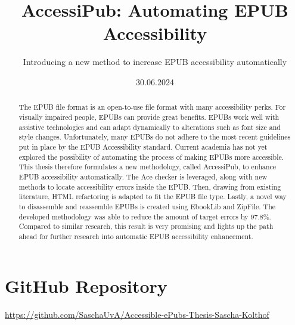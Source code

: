 \documentclass[ds, nofrontpicture, nolinenumbering, nosecondcompanypicture, nofirstcompanypicture]{mscthesis}
\title{AccessiPub: Automating EPUB Accessibility}
\subtitle{Introducing a new method to increase EPUB accessibility automatically}
\date{30.06.2024}
\begin{document}
\pagestyle{plain}

\maketitlepage
\fixemptypage
\setcounter{page}{1}

\begin{abstract}
\thispagestyle{plain}
The EPUB file format is an open-to-use file format with many accessibility perks. For visually impaired people, EPUBs can provide great benefits. EPUBs work well with assistive technologies and can adapt dynamically to alterations such as font size and style changes. 
Unfortunately, many EPUBs do not adhere to the most recent guidelines put in place by the EPUB Accessibility standard. Current academia has not yet explored the possibility of automating the process of making EPUBs more accessible. 
This thesis therefore formulates a new methodology, called AccessiPub, to enhance EPUB accessibility automatically. The Ace checker is leveraged, along with new methods to locate accessibility errors inside the EPUB. Then, drawing from existing literature, HTML refactoring is adapted to fit the EPUB file type. Lastly, a novel way to disassemble and reassemble EPUBs is created using EbookLib and ZipFile. 
The developed methodology was able to reduce the amount of target errors by 97.8\%. Compared to similar research, this result is very promising and lights up the path ahead for further research into automatic EPUB accessibility enhancement.
\end{abstract}

\maketitle

\section*{GitHub Repository}
\small
\url{https://github.com/SaschaUvA/Accessible-ePubs-Thesis-Sascha-Kolthof}
\normalsize











\newpage

\end{document}

